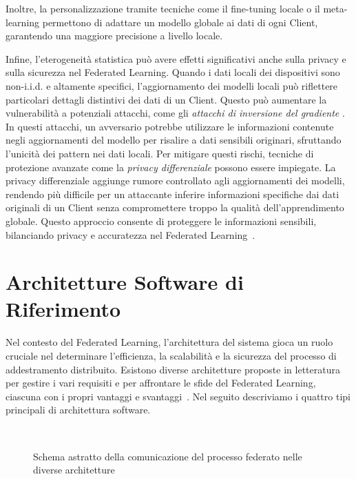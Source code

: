 \documentclass[a4paper, oneside, openright]{report}
\let\oldsection\section
\renewcommand{\section}{\newpage\oldsection}
\begin{document}
Inoltre, la personalizzazione tramite tecniche come il fine-tuning locale o il meta-learning permettono di adattare un modello globale ai dati di ogni Client, garantendo una maggiore precisione a livello locale. 


Infine, l'eterogeneità statistica può avere effetti significativi anche sulla privacy e sulla sicurezza nel Federated Learning. Quando i dati locali dei dispositivi sono non-i.i.d. e altamente specifici, l'aggiornamento dei modelli locali può riflettere particolari dettagli distintivi dei dati di un Client. Questo può aumentare la vulnerabilità a potenziali attacchi, come gli \textit{attacchi di inversione del gradiente} \cite{zhang2022surveygradientinversionattacks}. In questi attacchi, un avversario potrebbe utilizzare le informazioni contenute negli aggiornamenti del modello per risalire a dati sensibili originari, sfruttando l’unicità dei pattern nei dati locali.
Per mitigare questi rischi, tecniche di protezione avanzate come la \textit{privacy differenziale} possono essere impiegate. La privacy differenziale aggiunge rumore controllato agli aggiornamenti dei modelli, rendendo più difficile per un attaccante inferire informazioni specifiche dai dati originali di un Client senza compromettere troppo la qualità dell'apprendimento globale. Questo approccio consente di proteggere le informazioni sensibili, bilanciando privacy e accuratezza nel Federated Learning~\cite{9714350}.


\section{Architetture Software di Riferimento}\label{chap:background:architetture}

Nel contesto del Federated Learning, l'architettura del sistema gioca un ruolo cruciale nel determinare l'efficienza, la scalabilità e la sicurezza del processo di addestramento distribuito. Esistono diverse architetture proposte in letteratura per gestire i vari requisiti e per affrontare le sfide del Federated Learning, ciascuna con i propri vantaggi e svantaggi~\cite{9359305}. Nel seguito descriviamo i quattro tipi principali di architettura software.


\begin{figure}
    \centering
     \\
    
    
    \caption{Schema astratto della comunicazione del processo federato nelle diverse architetture}
    \label{fig:arch-types}
    
\end{figure}
\end{document}
